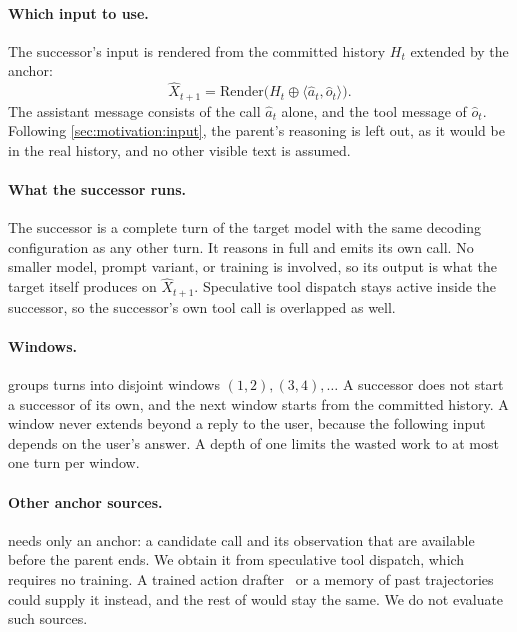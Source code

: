 \paragraph{Which input to use.}
The successor's input is rendered from the committed history $H_t$ extended by the anchor:
\begin{equation}
  \hat X_{t+1}=\mathrm{Render}\big(H_t\oplus\langle\hat a_t,\hat o_t\rangle\big).
  \label{eq:input}
\end{equation}
The assistant message consists of the call $\hat a_t$ alone, and the tool message of $\hat o_t$.
Following \cref{sec:motivation:input}, the parent's reasoning is left out, as it would be in the real history, and no other visible text is assumed.

\paragraph{What the successor runs.}
The successor is a complete turn of the target model with the same decoding configuration as any other turn.
It reasons in full and emits its own call.
No smaller model, prompt variant, or training is involved, so its output is what the target itself produces on $\hat X_{t+1}$.
Speculative tool dispatch stays active inside the successor, so the successor's own tool call is overlapped as well.

\paragraph{Windows.}
\method groups turns into disjoint windows $(1,2),(3,4),\dots$
A successor does not start a successor of its own, and the next window starts from the committed history.
A window never extends beyond a reply to the user, because the following input depends on the user's answer.
A depth of one limits the wasted work to at most one turn per window.

\paragraph{Other anchor sources.}
\stratLaunch needs only an anchor: a candidate call and its observation that are available before the parent ends.
We obtain it from speculative tool dispatch, which requires no training.
A trained action drafter~\citep{xu2026leap} or a memory of past trajectories~\citep{li2026specmemory} could supply it instead, and the rest of \method would stay the same.
We do not evaluate such sources.

